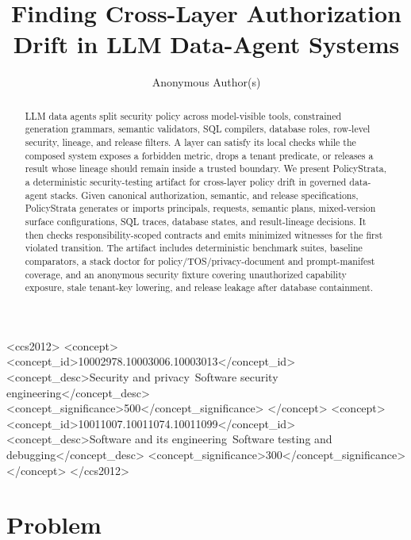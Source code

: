 \documentclass[sigconf,review,anonymous]{acmart}
\title{Finding Cross-Layer Authorization Drift in LLM Data-Agent Systems}
\author{Anonymous Author(s)}
\affiliation{%
  \institution{Anonymous Institution}
  \country{}}
\newcommand{\tool}{PolicyStrata}
\begin{document}
\begin{abstract}
LLM data agents split security policy across model-visible tools, constrained
generation grammars, semantic validators, SQL compilers, database roles, row-level
security, lineage, and release filters. A layer can satisfy its local checks
while the composed system exposes a forbidden metric, drops a tenant predicate,
or releases a result whose lineage should remain inside a trusted boundary. We
present \tool{}, a deterministic security-testing artifact for cross-layer policy
drift in governed data-agent stacks. Given canonical authorization, semantic,
and release specifications, \tool{} generates or imports principals, requests,
semantic plans, mixed-version surface configurations, SQL traces, database
states, and result-lineage decisions. It then checks responsibility-scoped
contracts and emits minimized witnesses for the first violated transition. The
artifact includes deterministic benchmark suites, baseline comparators, a stack
doctor for policy/TOS/privacy-document and prompt-manifest coverage, and an
anonymous security fixture covering unauthorized capability exposure, stale
tenant-key lowering, and release leakage after database containment.
\end{abstract}


\begin{CCSXML}
<ccs2012>
   <concept>
       <concept_id>10002978.10003006.10003013</concept_id>
       <concept_desc>Security and privacy~Software security engineering</concept_desc>
       <concept_significance>500</concept_significance>
   </concept>
   <concept>
       <concept_id>10011007.10011074.10011099</concept_id>
       <concept_desc>Software and its engineering~Software testing and debugging</concept_desc>
       <concept_significance>300</concept_significance>
   </concept>
</ccs2012>
\end{CCSXML}


\maketitle

\section{Problem}
\end{document}
